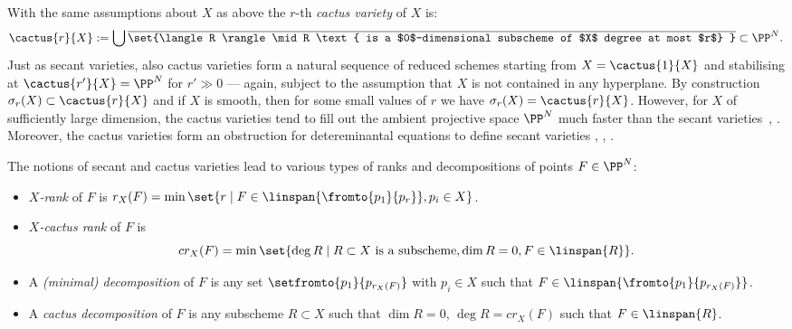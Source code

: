 \documentclass[12pt,a4paper]{article}
\begin{document}
With the same assumptions about $X$ as above the $r$-th \emph{cactus variety} of $X$ is:
\[
  \cactus{r}{X}:= \bigcup \overline{\set{\langle R \rangle  \mid R \text{ is a $0$-dimensional  subscheme of $X$ degree at most $r$}  }} \subset \PP^N.
\]
Just as secant varieties, also cactus varieties form a natural sequence of reduced schemes starting
from $X=\cactus{1}{X}$ and  stabilising at $\cactus{r'}{X}=\PP^N$ for $r'\gg0$
--- again, subject to the assumption that $X$ is not contained in any hyperplane.
By construction $\sigma_r(X)\subset \cactus{r}{X}$ and if $X$ is smooth, then for some
small values of $r$ we have $\sigma_r(X)=  \cactus{r}{X}$.
However, for $X$ of sufficiently large dimension, the cactus varieties tend to fill out
the ambient projective space $\PP^N$ much faster than
the secant varieties~\cite[Thms~3, 4]{bernardi_ranestad_cactus_rank_of_cubics}, \cite[Cor.~1.7]{galazka_mgr_publ}.
Moreover, the cactus varieties form an obstruction for detereminantal equations
to define secant varieties \cite{nisiabu_jabu_cactus}, \cite{galazka_vb_cactus}, \cite[Thm~1.18]{galazka_phd}.

The notions of secant and cactus varieties lead to various types of ranks and decompositions of points $F\in \PP^N$:

\begin{itemize}
 \item  \emph{$X$-rank} of $F$ is $r_X(F)
      = \min\set {r \mid
        F\in \linspan{\fromto{p_1}{p_r}},
          p_i \in X}$.
 \item \emph{$X$-cactus rank} of $F$ is
      \[
        cr_X(F) = \min\set {\deg R \mid
        R \subset X \text{ is a subscheme}, \dim R =0,  F\in\linspan{R}}.
      \]
 \item A \emph{(minimal) decomposition} of $F$
   is any set $\setfromto{p_1}{p_{r_X(F)}}$
   with $p_i \in X$ such that $F\in \linspan{\fromto{p_1}{p_{r_X(F)}}}$.
 \item A \emph{cactus decomposition} of $F$
   is any subscheme $R\subset X$ such that $\dim R=0$, $\deg R = cr_X(F)$ such that $F\in \linspan{R}$.
\end{itemize}
\end{document}
